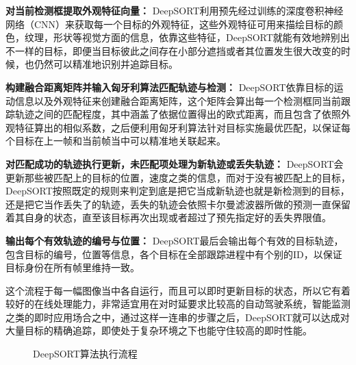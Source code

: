 \textbf{对当前检测框提取外观特征向量： }DeepSORT利用预先经过训练的深度卷积神经网络（CNN）来获取每一个目标的外观特征，这些外观特征可用来描绘目标的颜色，纹理，形状等视觉方面的信息，依靠这些特征，DeepSORT就能有效地辨别出不一样的目标，即便当目标彼此之间存在小部分遮挡或者其位置发生很大改变的时候，也仍然可以精准地识别并追踪目标。

\textbf{构建融合距离矩阵并输入匈牙利算法匹配轨迹与检测： }DeepSORT依靠目标的运动信息以及外观特征来创建融合距离矩阵，这个矩阵会算出每一个检测框同当前跟踪轨迹之间的匹配程度，其中涵盖了依据位置得出的欧式距离，而且包含了依照外观特征算出的相似系数，之后便利用匈牙利算法针对目标实施最优匹配，以保证每个目标在上一帧和当前帧当中可以精准地关联起来。

\textbf{对匹配成功的轨迹执行更新，未匹配项处理为新轨迹或丢失轨迹： }DeepSORT会更新那些被匹配上的目标的位置，速度之类的信息，而对于没有被匹配上的目标，DeepSORT按照既定的规则来判定到底是把它当成新轨迹也就是新检测到的目标，还是把它当作丢失了的轨迹，丢失的轨迹会依照卡尔曼滤波器所做的预测一直保留着其自身的状态，直至该目标再次出现或者超过了预先指定好的丢失界限值。

\textbf{输出每个有效轨迹的编号与位置： }DeepSORT最后会输出每个有效的目标轨迹，包含目标的编号，位置等信息，各个目标在全部跟踪进程中有个别的ID，以保证目标身份在所有帧里维持一致。

这个流程于每一幅图像当中各自运行，而且可以即时更新目标的状态，所以它有着较好的在线处理能力，非常适宜用在对时延要求比较高的自动驾驶系统，智能监测之类的即时应用场合之中，通过这样一连串的步骤之后，DeepSORT就可以达成对大量目标的精确追踪，即使处于复杂环境之下也能守住较高的即时性能。

\begin{figure}[H]
	\centering
	\caption{DeepSORT算法执行流程}
	\label{fig:example_image}
\end{figure}

